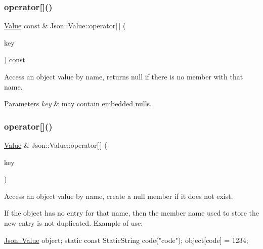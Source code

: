 \subsubsection{\texorpdfstring{operator[]()}{operator[]()}\hspace{0.1cm}{\footnotesize\ttfamily [8/9]}}
{\footnotesize\ttfamily \hyperlink{classJson_1_1Value}{Value} const  \& Json\+::\+Value\+::operator\mbox{[}$\,$\mbox{]} (\begin{DoxyParamCaption}\item[{const J\+S\+O\+N\+C\+P\+P\+\_\+\+S\+T\+R\+I\+NG \&}]{key }\end{DoxyParamCaption}) const}

Access an object value by name, returns null if there is no member with that name. 
\begin{DoxyParams}{Parameters}
{\em key} & may contain embedded nulls. \\
\hline
\end{DoxyParams}
\mbox{\label{classJson_1_1Value_ac3763d7d315ca65dc188e273722f7955}} 
\subsubsection{\texorpdfstring{operator[]()}{operator[]()}\hspace{0.1cm}{\footnotesize\ttfamily [9/9]}}
{\footnotesize\ttfamily \hyperlink{classJson_1_1Value}{Value} \& Json\+::\+Value\+::operator\mbox{[}$\,$\mbox{]} (\begin{DoxyParamCaption}\item[{const \hyperlink{classJson_1_1StaticString}{Static\+String} \&}]{key }\end{DoxyParamCaption})}



Access an object value by name, create a null member if it does not exist. 

If the object has no entry for that name, then the member name used to store the new entry is not duplicated. Example of use\+: 
\begin{DoxyCode}
\hyperlink{classJson_1_1Value}{Json::Value} object;
\textcolor{keyword}{static} \textcolor{keyword}{const} StaticString code(\textcolor{stringliteral}{"code"});
\textcolor{keywordtype}{object}[code] = 1234;
\end{DoxyCode}
 \mbox{\label{classJson_1_1Value_a64160c23c1f2f8b33913364f25d6c58d}} 
